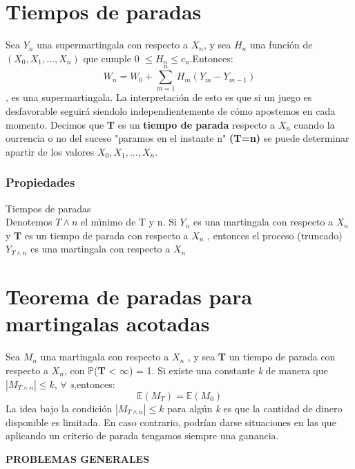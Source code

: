 \documentclass[letterpaper, 10 pt, conference]{ieeeconf}  %
\begin{document}
\section{Tiempos de paradas}\label{sec:2.3}
Sea {$Y_{n}$} una supermartingala con respecto a $X_{n}$, y sea $H_{n}$ una función de $(X_{0},X_{1},...,X_{n})$ que cumple 0 $ \leq H_{n} \leq  c_{n}$.Entonces:
\begin{equation*}
W_{n}= W_{0} + \sum_{m=1}^{n} H_{m}(Y_{m}-Y_{m-1})
\end{equation*} , es una supermartingala. La interpretación de esto es que si un juego es desfavorable seguirá siendolo independientemente de cómo apostemos en cada momento. Decimos que \textbf{T} es un \textbf{tiempo de parada} respecto a $X_{n}$ cuando la ourrencia o no del suceso "paramos en el instante n"  \textbf{(T=n)} se puede determinar apartir de los valores 
$X_{0},X_{1},...,X_{n}$.
\subsubsection{Propiedades} Tiempos de paradas\\
Denotemos \textbf{$T \wedge n$} el mı́nimo de T y n.
Si $Y_{n}$ es una martingala con respecto a $X_{n} $ y \textbf{T} es un tiempo de parada con respecto a $X_{n} $ , entonces el proceso (truncado) $Y_{T\wedge n} $ es una martingala con respecto a $X_{n}$


\section{  Teorema de paradas para martingalas acotadas}
Sea $M_{n}$ una martingala con respecto a $X_{n} $ , y sea \textbf{T} un
tiempo de parada con respecto a $X_{n} $, con \(\mathbb{P}\)(\textbf{T} < $\infty$) = 1. Si
existe una constante \textit{k} de manera que $|M_{T\wedge n}| \leq \textit{k}$,  $\forall$ \textit{s},entonces:
\begin{equation*}
\mathbb{E} (M_{T}) = \mathbb{E} (M_{0})
\end{equation*}
La idea bajo la condición $|M_{T\wedge n}| \leq \textit{k}$ para algún \textit{k} es que la
cantidad de dinero disponible es limitada. En caso contrario,
podrían darse situaciones en las que aplicando un criterio de
parada tengamos siempre una ganancia.\\
\newpage
\begin{center}
\bf{PROBLEMAS GENERALES}
\end{center}
\end{document}
